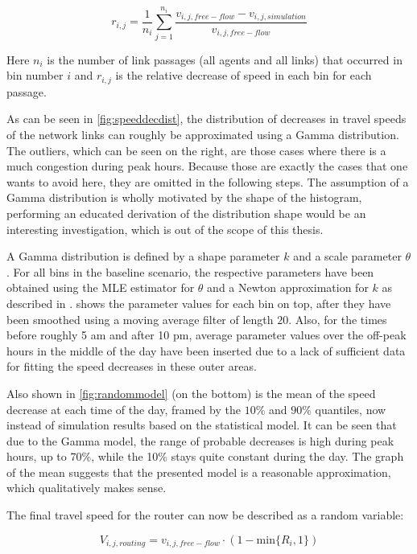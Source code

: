 \begin{equation}
r_{i,j} = \frac{1}{n_i} \sum_{j=1}^{n_i} \frac{v_{i,j,free-flow} - v_{i,j,simulation}}{v_{i,j,free-flow}}
\end{equation}

Here $n_i$ is the number of link passages (all agents and all links) that occurred
in bin number $i$ and $r_{i,j}$ is the relative decrease of speed in each bin for
each passage.

As can be seen in \cref{fig:speeddecdist}, the distribution of decreases in travel
speeds of the network links can roughly be approximated using a Gamma distribution. The outliers,
which can be seen on the right, are those cases where there is a much congestion during
peak hours. Because those are exactly the cases that one wants to avoid here, they
are omitted in the following steps.
The assumption of a Gamma distribution is wholly motivated by the shape of the histogram,
performing an educated derivation of the distribution shape would be an interesting
investigation, which is out of the scope of this thesis.

A Gamma distribution is defined by a shape parameter $k$ and a scale parameter $\theta$. For
all bins in the baseline scenario, the respective parameters have been obtained using
the MLE estimator for $\theta$ and a Newton approximation for $k$ as described in
\citet{Minka2002}.  shows the parameter values for each bin on top,
after they have been smoothed using a moving average filter of length $20$. Also,
for the times before roughly 5 am and after 10 pm, average parameter values over the
off-peak hours in the middle of the day have been inserted due to a lack of sufficient
data for fitting the speed decreases in these outer areas.

Also shown in \cref{fig:randommodel} (on the bottom) is the mean of the speed decrease at each time of the
day, framed by the $10\%$ and $90\%$ quantiles, now instead of simulation results based on the statistical model.
It can be seen that due to the Gamma model, the range of probable decreases is high during peak hours, up to 70\%,
while the 10\% stays quite constant during the day. The graph of the mean suggests that the presented
model is a reasonable approximation, which qualitatively makes sense.

The final travel speed for the router can now be described as a random variable:

\begin{equation}
    V_{i,j,routing} = v_{i,j,free-flow} \cdot (1 - \text{min}\{ R_i, 1 \})
\end{equation}

